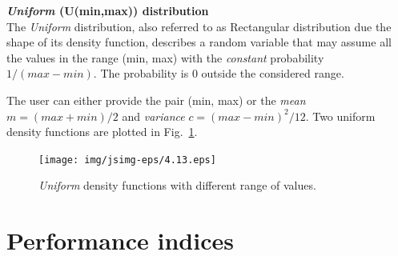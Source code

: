 \textbf{\emph{Uniform} (U(min,max)) distribution}\\
The \emph{Uniform} distribution, also referred to as Rectangular
distribution due the shape of its density function, describes a
random variable that may assume all the values in the range (min,
max) with the \emph{constant} probability $1/(max-min)$. The
probability is 0 outside the considered range.

The user can either provide the pair (min, max) or the \emph{mean}
$m=(max+min)/2$ and \emph{variance} $c=(max-min)^2 / 12$. Two
uniform density functions are plotted in Fig.~\ref{fig:famUnif}.
\begin{figure}[htb]
    \begin{center}
        \texttt{[image: img/jsimg-eps/4.13.eps]}
    \end{center}
    \caption{\emph{Uniform} density functions with different range of values.}
    \label{fig:famUnif}
\end{figure}

\section{Performance indices}
\label{perfinde}

